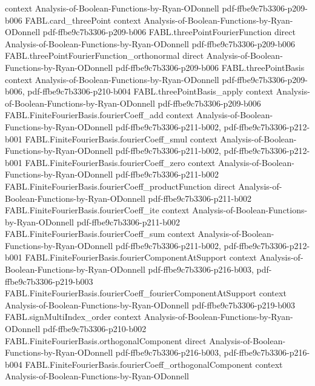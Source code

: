 \begin{theorem}
  {context}
  {Analysis-of-Boolean-Functions-by-Ryan-ODonnell}
  {pdf-ffbe9c7b3306-p209-b006}
\proofstep
  {FABL.card_threePoint}
  {context}
  {Analysis-of-Boolean-Functions-by-Ryan-ODonnell}
  {pdf-ffbe9c7b3306-p209-b006}
\proofstep
  {FABL.threePointFourierFunction}
  {direct}
  {Analysis-of-Boolean-Functions-by-Ryan-ODonnell}
  {pdf-ffbe9c7b3306-p209-b006}
\proofstep
  {FABL.threePointFourierFunction_orthonormal}
  {direct}
  {Analysis-of-Boolean-Functions-by-Ryan-ODonnell}
  {pdf-ffbe9c7b3306-p209-b006}
\proofstep
  {FABL.threePointBasis}
  {context}
  {Analysis-of-Boolean-Functions-by-Ryan-ODonnell}
  {pdf-ffbe9c7b3306-p209-b006,
    pdf-ffbe9c7b3306-p210-b004}
\proofstep
  {FABL.threePointBasis_apply}
  {context}
  {Analysis-of-Boolean-Functions-by-Ryan-ODonnell}
  {pdf-ffbe9c7b3306-p209-b006}
\proofstep
  {FABL.FiniteFourierBasis.fourierCoeff_add}
  {context}
  {Analysis-of-Boolean-Functions-by-Ryan-ODonnell}
  {pdf-ffbe9c7b3306-p211-b002,
    pdf-ffbe9c7b3306-p212-b001}
\proofstep
  {FABL.FiniteFourierBasis.fourierCoeff_smul}
  {context}
  {Analysis-of-Boolean-Functions-by-Ryan-ODonnell}
  {pdf-ffbe9c7b3306-p211-b002,
    pdf-ffbe9c7b3306-p212-b001}
\proofstep
  {FABL.FiniteFourierBasis.fourierCoeff_zero}
  {context}
  {Analysis-of-Boolean-Functions-by-Ryan-ODonnell}
  {pdf-ffbe9c7b3306-p211-b002}
\proofstep
  {FABL.FiniteFourierBasis.fourierCoeff_productFunction}
  {direct}
  {Analysis-of-Boolean-Functions-by-Ryan-ODonnell}
  {pdf-ffbe9c7b3306-p211-b002}
\proofstep
  {FABL.FiniteFourierBasis.fourierCoeff_ite}
  {context}
  {Analysis-of-Boolean-Functions-by-Ryan-ODonnell}
  {pdf-ffbe9c7b3306-p211-b002}
\proofstep
  {FABL.FiniteFourierBasis.fourierCoeff_sum}
  {context}
  {Analysis-of-Boolean-Functions-by-Ryan-ODonnell}
  {pdf-ffbe9c7b3306-p211-b002,
    pdf-ffbe9c7b3306-p212-b001}
\proofstep
  {FABL.FiniteFourierBasis.fourierComponentAtSupport}
  {context}
  {Analysis-of-Boolean-Functions-by-Ryan-ODonnell}
  {pdf-ffbe9c7b3306-p216-b003,
    pdf-ffbe9c7b3306-p219-b003}
\proofstep
  {FABL.FiniteFourierBasis.fourierCoeff_fourierComponentAtSupport}
  {context}
  {Analysis-of-Boolean-Functions-by-Ryan-ODonnell}
  {pdf-ffbe9c7b3306-p219-b003}
\proofstep
  {FABL.signMultiIndex_order}
  {context}
  {Analysis-of-Boolean-Functions-by-Ryan-ODonnell}
  {pdf-ffbe9c7b3306-p210-b002}
\proofstep
  {FABL.FiniteFourierBasis.orthogonalComponent}
  {direct}
  {Analysis-of-Boolean-Functions-by-Ryan-ODonnell}
  {pdf-ffbe9c7b3306-p216-b003,
    pdf-ffbe9c7b3306-p216-b004}
\proofstep
  {FABL.FiniteFourierBasis.fourierCoeff_orthogonalComponent}
  {context}
  {Analysis-of-Boolean-Functions-by-Ryan-ODonnell}

\end{theorem}
